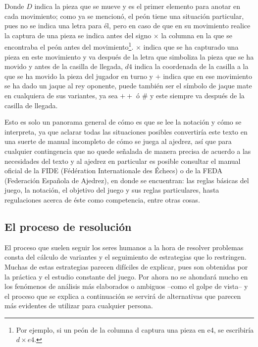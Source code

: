 \documentclass[twoside,openright,12pt,a4paper,spanish]{book}
\begin{document}
\normalsize
Donde $D$ indica la pieza que se mueve y es el primer elemento para anotar en cada movimiento; como ya se mencionó, el peón tiene una situación particular, pues no se indica una letra para él, pero en caso de que en su movimiento realice la captura de una pieza se indica antes del signo $\times$ la columna en la que se encontraba el peón antes del movimiento\footnote{Por ejemplo, si un peón de la columna d captura una pieza en e4, se escribiría $d\times e4$.}. $\times$ indica que se ha capturado una pieza en este movimiento y va después de la letra que simboliza la pieza que se ha movido y antes de la casilla de llegada, $d4$ indica la coordenada de la casilla a la que se ha movido la pieza del jugador en turno y $+$ indica que en ese movimiento se ha dado un jaque al rey oponente, puede también ser el símbolo de jaque mate en cualquiera de sus variantes, ya sea $++$ ó $\#$ y este siempre va después de la casilla de llegada.

Esto es solo un panorama general de cómo es que se lee la notación y cómo se interpreta, ya que aclarar todas las situaciones posibles convertiría este texto en una suerte de manual incompleto de cómo se juega al ajedrez, así que para cualquier contingencia que no quede señalada de manera precisa de acuerdo a las necesidades del texto y al ajedrez en particular es posible consultar el manual oficial de la FIDE (Fédération Internationale des Échecs) o de la FEDA (Federación Española de Ajedrez), en donde se encuentran: las reglas básicas del juego, la notación, el objetivo del juego y sus reglas particulares, hasta regulaciones acerca de éste como competencia, entre otras cosas.

\subsection{El proceso de resolución}

\noindent El proceso que suelen seguir los seres humanos a la hora de resolver problemas consta del cálculo de variantes y el seguimiento de estrategias que lo restringen. Muchas de estas estrategias parecen difíciles de explicar, pues son obtenidas por la práctica y el estudio constante del juego. Por ahora no se ahondará mucho en los fenómenos de análisis más elaborados o ambiguos --como el golpe de vista-- y el proceso que se explica a continuación se servirá de alternativas que parecen más evidentes de utilizar para cualquier persona.
\end{document}
